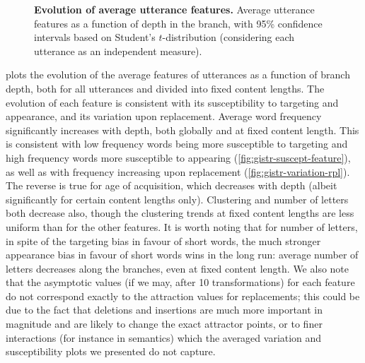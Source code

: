 \documentclass[a4paper,fleqn]{cas-dc}
\begin{document}
\begin{figure}
  \centering



  \caption[Evolution of average utterance features]{
  \textbf{Evolution of average utterance features.}
  Average utterance features as a function of depth in the branch, with 95\% confidence intervals based on Student's $t$-distribution (considering each utterance as an independent measure).
  }
  \label{fig:gistr-branchevo}
\end{figure}

 plots the evolution of the average features
of utterances as a function of branch depth, both for all utterances and
divided into fixed content lengths. The evolution of each feature is
consistent with its susceptibility to targeting and appearance, and its
variation upon replacement. Average word frequency significantly
increases with depth, both globally and at fixed content length. This is
consistent with low frequency words being more susceptible to targeting
and high frequency words more susceptible to appearing
(\cref{fig:gistr-suscept-feature}), as well as with frequency increasing
upon replacement (\cref{fig:gistr-variation-rpl}). The reverse is true
for age of acquisition, which decreases with depth (albeit significantly
for certain content lengths only). Clustering and number of letters both
decrease also, though the clustering trends at fixed content lengths are
less uniform than for the other features. It is worth noting that for
number of letters, in spite of the targeting bias in favour of short
words, the much stronger appearance bias in favour of short words wins
in the long run: average number of letters decreases along the branches,
even at fixed content length. We also note that the asymptotic values
(if we may, after 10 transformations) for each feature do not correspond
exactly to the attraction values for replacements; this could be due to
the fact that deletions and insertions are much more important in
magnitude and are likely to change the exact attractor points, or to
finer interactions (for instance in semantics) which the averaged
variation and susceptibility plots we presented do not capture.
\end{document}
